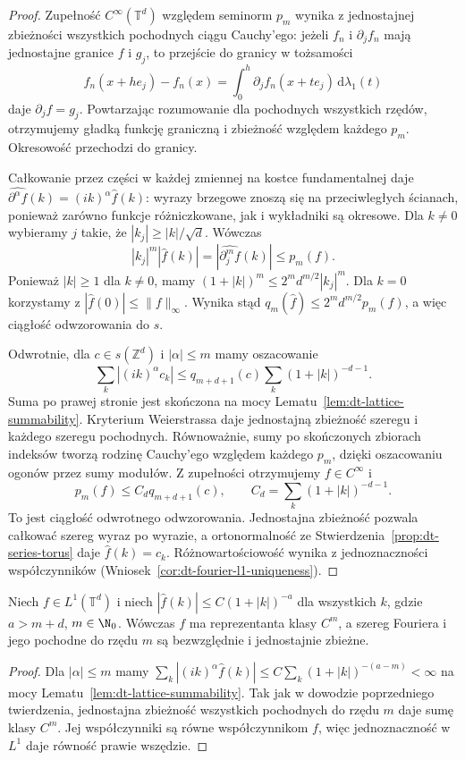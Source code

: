 \begin{proof}
Zupełność $C^\infty(\mathbb T^d)$ względem
seminorm $p_m$ wynika z jednostajnej zbieżności
wszystkich pochodnych ciągu Cauchy'ego:
jeżeli $f_n$ i $\partial_j f_n$ mają jednostajne
granice $f$ i $g_j$, to przejście do granicy
w tożsamości
\[
 f_n(x+he_j)-f_n(x)=
 \int_0^h\partial_jf_n(x+te_j)\,\mathrm d\lambda_1(t)
\]
daje $\partial_j f=g_j$. Powtarzając rozumowanie
dla pochodnych wszystkich rzędów, otrzymujemy
gładką funkcję graniczną i zbieżność względem
każdego $p_m$. Okresowość przechodzi do granicy.

Całkowanie przez części w każdej zmiennej
na kostce fundamentalnej daje
$\widehat{\partial^\alpha f}(k)=(ik)^\alpha\widehat f(k)$:
wyrazy brzegowe znoszą się na przeciwległych
ścianach, ponieważ zarówno funkcje różniczkowane,
jak i wykładniki są okresowe.
Dla $k\ne0$ wybieramy $j$ takie, że
$|k_j|\ge |k|/\sqrt d$. Wówczas
\[
 |k_j|^m|\widehat f(k)|
 =|\widehat{\partial_j^m f}(k)|\le p_m(f).
\]
Ponieważ $|k|\ge1$ dla $k\ne0$, mamy
$(1+|k|)^m\le 2^m d^{m/2}|k_j|^m$.
Dla $k=0$ korzystamy z
$|\widehat f(0)|\le\|f\|_\infty$.
Wynika stąd $q_m(\widehat f)\le 2^m d^{m/2}p_m(f)$,
a więc ciągłość odwzorowania do $s$.

Odwrotnie, dla $c\in s(\mathbb Z^d)$ i
$|\alpha|\le m$ mamy oszacowanie
\[
 \sum_k|(ik)^\alpha c_k|
 \le q_{m+d+1}(c)\sum_k(1+|k|)^{-d-1}.
\]
Suma po prawej stronie jest skończona na mocy
Lematu~\ref{lem:dt-lattice-summability}.
Kryterium Weierstrassa daje jednostajną
zbieżność szeregu i każdego szeregu pochodnych.
Równoważnie, sumy po skończonych zbiorach
indeksów tworzą rodzinę Cauchy'ego względem
każdego $p_m$, dzięki oszacowaniu ogonów
przez sumy modułów. Z zupełności otrzymujemy
$f\in C^\infty$ i
\[
 p_m(f)\le C_d q_{m+d+1}(c),
 \qquad C_d=\sum_k(1+|k|)^{-d-1}.
\]
To jest ciągłość odwrotnego odwzorowania.
Jednostajna zbieżność pozwala całkować
szereg wyraz po wyrazie, a ortonormalność ze
Stwierdzenia~\ref{prop:dt-series-torus}
daje $\widehat f(k)=c_k$.
Różnowartościowość wynika z jednoznaczności
współczynników (Wniosek~\ref{cor:dt-fourier-l1-uniqueness}).
\end{proof}

\begin{wniosek}
\label{cor:dt-fourier-finite-regularity}
Niech $f\in L^1(\mathbb T^d)$ i niech
$|\widehat f(k)|\le C(1+|k|)^{-a}$ dla wszystkich $k$,
gdzie $a>m+d$, $m\in\N_0$.
Wówczas $f$ ma reprezentanta klasy $C^m$,
a szereg Fouriera i jego pochodne do rzędu $m$
są bezwzględnie i jednostajnie zbieżne.
\end{wniosek}
\begin{proof}
Dla $|\alpha|\le m$ mamy
$\sum_k|(ik)^\alpha\widehat f(k)|
\le C\sum_k(1+|k|)^{-(a-m)}<\infty$
na mocy Lematu~\ref{lem:dt-lattice-summability}.
Tak jak w dowodzie poprzedniego twierdzenia,
jednostajna zbieżność wszystkich pochodnych
do rzędu $m$ daje sumę klasy $C^m$.
Jej współczynniki są równe współczynnikom $f$,
więc jednoznaczność w $L^1$ daje równość
prawie wszędzie.
\end{proof}

